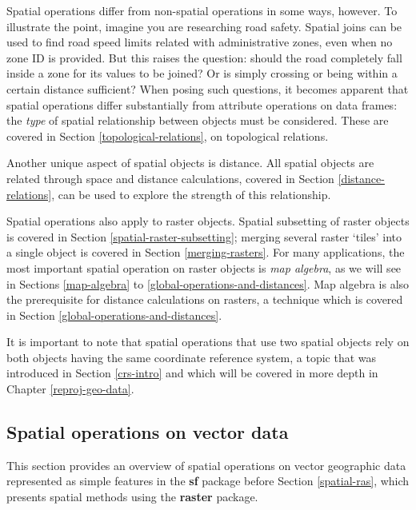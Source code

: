 \documentclass[]{krantz}
\let\BeginKnitrBlock\begin \let\EndKnitrBlock\end
\begin{document}
Spatial operations differ from non-spatial operations in some ways, however.
To illustrate the point, imagine you are researching road safety.
Spatial joins can be used to find road speed limits related with administrative zones, even when no zone ID is provided.
But this raises the question: should the road completely fall inside a zone for its values to be joined?
Or is simply crossing or being within a certain distance sufficient?
When posing such questions, it becomes apparent that spatial operations differ substantially from attribute operations on data frames:
the \emph{type} of spatial relationship between objects must be considered.
These are covered in Section \ref{topological-relations}, on topological relations.

Another unique aspect of spatial objects is distance.
All spatial objects are related through space and distance calculations, covered in Section \ref{distance-relations}, can be used to explore the strength of this relationship.

Spatial operations also apply to raster objects.
Spatial subsetting of raster objects is covered in Section \ref{spatial-raster-subsetting}; merging several raster `tiles' into a single object is covered in Section \ref{merging-rasters}.
For many applications, the most important spatial operation on raster objects is \emph{map algebra}, as we will see in Sections \ref{map-algebra} to \ref{global-operations-and-distances}.
Map algebra is also the prerequisite for distance calculations on rasters, a technique which is covered in Section \ref{global-operations-and-distances}.

\BeginKnitrBlock{rmdnote}
It is important to note that spatial operations that use two spatial objects rely on both objects having the same coordinate reference system, a topic that was introduced in Section \ref{crs-intro} and which will be covered in more depth in Chapter \ref{reproj-geo-data}.
\EndKnitrBlock{rmdnote}

\hypertarget{spatial-vec}{%
\subsection{Spatial operations on vector data}\label{spatial-vec}}

This section provides an overview of spatial operations on vector geographic data represented as simple features in the \textbf{sf} package before Section \ref{spatial-ras}, which presents spatial methods using the \textbf{raster} package.
\end{document}
